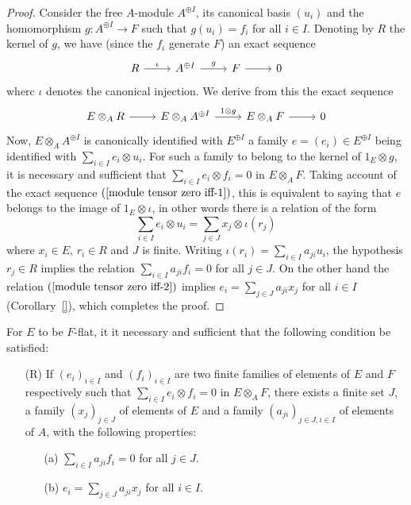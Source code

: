\begin{proof}
Consider the free $A$-module $A^{\oplus I}$, its canonical basis $(u_i)$ and the homomorphism $g:A^{\oplus I}\to F$ such that $g(u_i)=f_i$ for all $i\in I$. Denoting by $R$ the kernel of $g$, we have (since the $f_i$ generate $F$) an exact sequence
\[\begin{tikzcd}
R\ar[r,"\iota"]&A^{\oplus I}\ar[r,"g"]&F\ar[r]&0
\end{tikzcd}\]
wherc $\iota$ denotes the canonical injection. We derive from this the exact sequence
\begin{equation}\label{module tensor zero iff-1}
\begin{tikzcd}
E\otimes_AR\ar[r]&E\otimes_AA^{\oplus I}\ar[r,"1\otimes g"]&E\otimes_AF\ar[r]&0
\end{tikzcd}
\end{equation}
Now, $E\otimes_AA^{\oplus I}$ is canonically identified with $E^{\oplus I}$ a family $e=(e_i)\in E^{\oplus I}$ being identified with $\sum_{i\in I}e_i\otimes u_i$. For such a family to belong to the kernel of $1_E\otimes g$, it is necessary and sufficient that $\sum_{i\in I}e_i\otimes f_i=0$ in $E\otimes_AF$. Taking account of the exact sequence $(\ref{module tensor zero iff-1})$, this is equivalent to saying that $e$ belongs to the image of $1_E\otimes\iota$, in other words there is a relation of the form
\begin{equation}\label{module tensor zero iff-2}
\sum_{i\in I}e_i\otimes u_i=\sum_{j\in J}x_j\otimes\iota(r_j)
\end{equation}
where $x_i\in E$, $r_i\in R$ and $J$ is finite. Writing $\iota(r_i)=\sum_{i\in I}a_{ji}u_i$, the hypothesis $r_j\in R$ implies the relation $\sum_{i\in I}a_{ji}f_i=0$ for all $j\in J$. On the other hand the relation $(\ref{module tensor zero iff-2})$ implies $e_i=\sum_{j\in J}a_{ji}x_j$ for all $i\in I$ (Corollary~\ref{}), which completes the proof.
\end{proof}
\begin{proposition}\label{module F-flat iff linear relation}
For $E$ to be $F$-flat, it it necessary and sufficient that the following condition be satisfied:
\begin{itemize}
\item[(R)] If $(e_i)_{i\in I}$ and $(f_i)_{i\in I}$ are two finite families of elements of $E$ and $F$ respectively such that $\sum_{i\in I}e_i\otimes f_i=0$ in $E\otimes_AF$, there exists a finite set $J$, a family $(x_j)_{j\in J}$ of elements of $E$ and a family $(a_{ji})_{j\in J,i\in I}$ of elements of $A$, with the following properties:
\begin{itemize}
\item[(a)] $\sum_{i\in I}a_{ji}f_i=0$ for all $j\in J$. 
\item[(b)] $e_i=\sum_{j\in J}a_{ji}x_j$ for all $i\in I$.
\end{itemize} 
\end{itemize}
\end{proposition}

